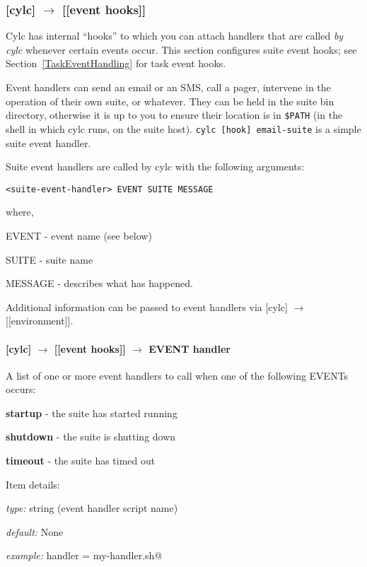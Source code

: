 \subsubsection[{[[}event hooks{]]}]{[cylc] $\rightarrow$ [[event hooks]]}
\label{SuiteEventHandling}

Cylc has internal ``hooks'' to which you can attach handlers that are
called {\em by cylc} whenever certain events occur. This section
configures suite event hooks; see Section~\ref{TaskEventHandling} for
task event hooks.

Event handlers can send an email or an SMS, call a pager, intervene in
the operation of their own suite, or whatever.
They can be held in the suite bin directory, otherwise it is up to you
to ensure their location is in \lstinline=$PATH= (in the shell in which
cylc runs, on the suite host).
\lstinline=cylc [hook] email-suite= is a simple suite event handler.

Suite event handlers are called by cylc with the following arguments:
\begin{lstlisting}
<suite-event-handler> EVENT SUITE MESSAGE
\end{lstlisting}
where,
\begin{myitemize}
    \item EVENT - event name (see below)
    \item SUITE - suite name
    \item MESSAGE - describes what has happened.
\end{myitemize}

Additional information can be passed to event handlers via
[cylc] $\rightarrow$ [[environment]].

\paragraph[EVENT handler]{[cylc] $\rightarrow$ [[event hooks]] $\rightarrow$ EVENT handler}

A list of one or more event handlers to call when one of the following EVENTs occurs:
\begin{myitemize}
    \item {\bf startup}  - the suite has started running
    \item {\bf shutdown} - the suite is shutting down
    \item {\bf timeout}  - the suite has timed out
\end{myitemize}

Item details:
\begin{myitemize}
    \item {\em type:} string (event handler script name)
    \item {\em default:} None
    \item {\em example:} \lstinline@startup handler = my-handler.sh@
\end{myitemize}

